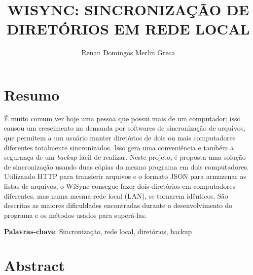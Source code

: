 \documentclass[12pt,a4paper]{ufpr}
\title{WISYNC: SINCRONIZAÇÃO DE DIRETÓRIOS EM REDE LOCAL}
\author{Renan Domingos Merlin Greca}
\begin{document}
\makecapa
\makerosto         %

\doublespacing            %

\pagestyle{headings}


\tableofcontents




\chapter*{Resumo}

É muito comum ver hoje uma pessoa que possui mais de um computador; isso causou um crescimento na demanda por softwares de sincronização de arquivos, que permitem a um usuário manter diretórios de dois ou mais computadores diferentes totalmente sincronizados.
Isso gera uma conveniência e também a segurança de um \textit{backup} fácil de realizar.
Neste projeto, é proposta uma solução de sincronização usando duas cópias do mesmo programa em dois computadores.
Utilizando HTTP para transferir arquivos e o formato JSON para armazenar as listas de arquivos, o WiSync consegue fazer dois diretórios em computadores diferentes, mas numa mesma rede local (LAN), se tornarem idênticos.
São descritas as maiores dificuldades encontradas durante o desenvolvimento do programa e os métodos usados para superá-las.

\noindent \textbf{Palavras-chave}: Sincronização, rede local, diretórios, backup

\chapter*{Abstract}
\end{document}
